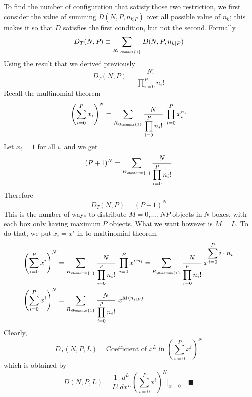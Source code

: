 \documentclass[../../main.tex]{subfiles}
\begin{document}
To find the number of configuration that satisfy those two restriction, we first consider the value of summing $D(N,P,n_{k|P})$ over all possible value of $n_k$; this makes it so that $D$ satisfies the first condition, but not the second. Formally 
\begin{equation*}
    D_T(N,P)\equiv \sum_{R_\Romannum{1}}D(N,P,n_{k|P})
\end{equation*}
Using the result that we derived previously 
\begin{equation*}
    D_T(N,P)= \frac{N!}{\displaystyle\prod_{i=0}^{P}n_i!}
\end{equation*}
Recall the multinomial theorem
\begin{equation*}
    \left(\sum_{i=0 }^{P}x_i\right)^N=\sum_{R_\Romannum{1}}^{}\frac{N}{\displaystyle\prod_{i=0}^{P}n_i!} \; \prod_{i=0}^{P}x_{i}^{n_{i}}
\end{equation*}
Let $x_i=1$ for all $i$, and we get 
\begin{equation*}
    (P+1)^N=\sum_{R_\Romannum{1}}^{}\frac{N}{\displaystyle\prod_{i=0}^{P}n_i!} 
\end{equation*}
Therefore 
\begin{equation*}
    D_T(N,P)=(P+1)^N
\end{equation*}
This is the number of ways to distribute $M=0,\dots, NP$ objects in $N$ boxes, with each box only having maximum $P$ objects. What we want however is $M=L$. To do that, we put $x_i=x^i$ in to multinomial theorem
\begin{align*}
    \left(\sum_{i=0 }^{P}x^i\right)^N&=\sum_{R_\Romannum{1}}^{}\frac{N}{\displaystyle\prod_{i=0}^{P}n_i!} \; \prod_{i=0}^{P}x^{i\cdot n_{i}}
    =\sum_{R_\Romannum{1}}^{}\frac{N}{\displaystyle\prod_{i=0}^{P}n_i!} \; x^{\displaystyle\sum_{i=0}^{P}i\cdot n_{i}}\\
    \left(\sum_{i=0 }^{P}x^i\right)^N&=\sum_{R_\Romannum{1}}^{}\frac{N}{\displaystyle\prod_{i=0}^{P}n_i!} \; x^{M(n_{i|P})}
\end{align*}
Clearly,
\begin{equation*}
    D_T(N,P,L)=\text{Coefficient of $x^L$ in } \left(\sum_{i=0 }^{P}x^i\right)^N
\end{equation*}
which is obtained by 
\begin{equation*}
    D(N,P,L)=\frac{1}{L!}\frac{d^L}{dx^L}\left(\sum_{i=0 }^{P}x^i\right)^N \bigg|_{x=0}\quad\blacksquare
\end{equation*}
\end{document}
